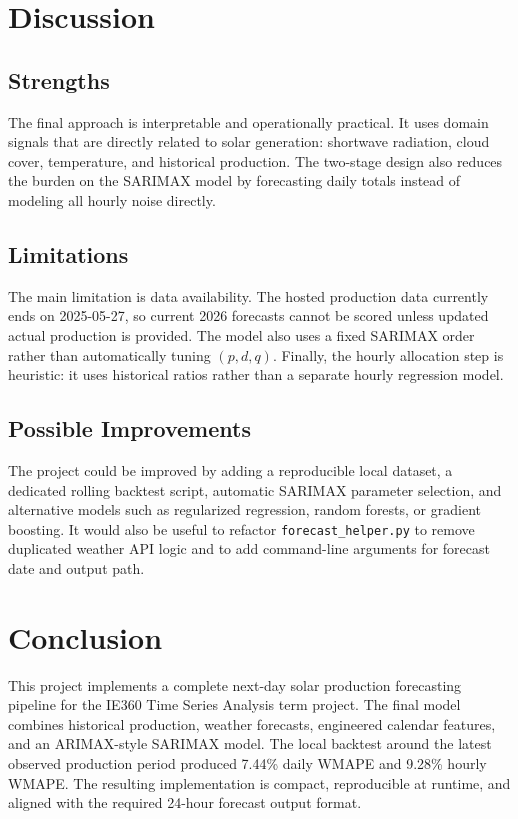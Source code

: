 \documentclass[11pt]{article}
\begin{document}
\section{Discussion}

\subsection{Strengths}

The final approach is interpretable and operationally practical. It uses domain
signals that are directly related to solar generation: shortwave radiation,
cloud cover, temperature, and historical production. The two-stage design also
reduces the burden on the SARIMAX model by forecasting daily totals instead of
modeling all hourly noise directly.

\subsection{Limitations}

The main limitation is data availability. The hosted production data currently
ends on 2025-05-27, so current 2026 forecasts cannot be scored unless updated
actual production is provided. The model also uses a fixed SARIMAX order rather
than automatically tuning \((p,d,q)\). Finally, the hourly allocation step is
heuristic: it uses historical ratios rather than a separate hourly regression
model.

\subsection{Possible Improvements}

The project could be improved by adding a reproducible local dataset, a
dedicated rolling backtest script, automatic SARIMAX parameter selection, and
alternative models such as regularized regression, random forests, or gradient
boosting. It would also be useful to refactor \texttt{forecast\_helper.py} to
remove duplicated weather API logic and to add command-line arguments for
forecast date and output path.

\section{Conclusion}

This project implements a complete next-day solar production forecasting
pipeline for the IE360 Time Series Analysis term project. The final model
combines historical production, weather forecasts, engineered calendar features,
and an ARIMAX-style SARIMAX model. The local backtest around the latest observed
production period produced 7.44\% daily WMAPE and 9.28\% hourly WMAPE. The
resulting implementation is compact, reproducible at runtime, and aligned with
the required 24-hour forecast output format.
\end{document}
